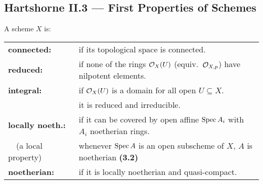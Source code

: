\documentclass[11pt]{article}
\newcommand{\Index}[1]{\index{#1}#1}
\newcommand{\indexThm}[1]{\index{Hartshorne!Theorems, etc.!#1}}
\newcommand{\Entry}[3][notcustom]{\Bullet
\ifthenelse{\equal{#1}{}}{}
{
\ifthenelse{\equal{#1}{notcustom}}{\index{#2}}{\index{#1}}
}
 \textbf{#2:}&#3}
\begin{document}
\begin{II.3 First Properties of Schemes}
\section*{Hartshorne II.3 --- First Properties of Schemes}
\begin{itemise}
\item A scheme $X$ is:\\
\begin{tabular}{p{}p{}}
\Entry{connected}{if its topological space is connected.}\\
\Entry{reduced}{if none of the rings $\mathcal{O}_X(U)$ (equiv.\ $\mathcal{O}_{X,p}$) have
nilpotent elements.}\\
\Entry{integral}{if $\mathcal{O}_X(U)$ is a domain for all open $U\subseteq X$.\\&
\Iff it is reduced and irreducible.}\\
\Entry[locally noetherian]{locally noeth.}{if it can be covered by open affine
$\operatorname{Spec} A_i$ with $A_i$ noetherian rings.\\{\ \ \small(a local property)}&
\Iff whenever $\operatorname{Spec} A$ is an open subscheme of $X$, $A$ is
noetherian\indexThm{II.3.02} \textbf{(3.2)}}\\
\Entry{noetherian}{if it is locally noetherian and quasi-compact.}
\end{tabular}
%
%

\end{itemise}
\end{II.3 First Properties of Schemes}
\end{document}
